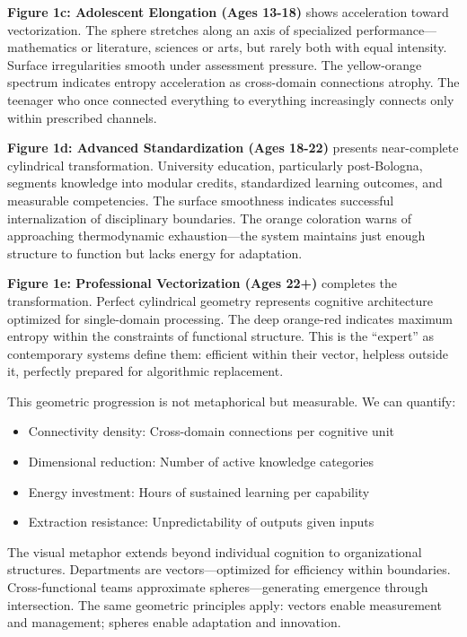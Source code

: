 \textbf{Figure 1c: Adolescent Elongation (Ages 13-18)} shows acceleration toward vectorization. The sphere stretches along an axis of specialized performance---mathematics or literature, sciences or arts, but rarely both with equal intensity. Surface irregularities smooth under assessment pressure. The yellow-orange spectrum indicates entropy acceleration as cross-domain connections atrophy. The teenager who once connected everything to everything increasingly connects only within prescribed channels.

\textbf{Figure 1d: Advanced Standardization (Ages 18-22)} presents near-complete cylindrical transformation. University education, particularly post-Bologna, segments knowledge into modular credits, standardized learning outcomes, and measurable competencies. The surface smoothness indicates successful internalization of disciplinary boundaries. The orange coloration warns of approaching thermodynamic exhaustion---the system maintains just enough structure to function but lacks energy for adaptation.

\textbf{Figure 1e: Professional Vectorization (Ages 22+)} completes the transformation. Perfect cylindrical geometry represents cognitive architecture optimized for single-domain processing. The deep orange-red indicates maximum entropy within the constraints of functional structure. This is the ``expert'' as contemporary systems define them: efficient within their vector, helpless outside it, perfectly prepared for algorithmic replacement.

This geometric progression is not metaphorical but measurable. We can quantify:
\begin{itemize}
\item Connectivity density: Cross-domain connections per cognitive unit
\item Dimensional reduction: Number of active knowledge categories
\item Energy investment: Hours of sustained learning per capability
\item Extraction resistance: Unpredictability of outputs given inputs
\end{itemize}

The visual metaphor extends beyond individual cognition to organizational structures. Departments are vectors---optimized for efficiency within boundaries. Cross-functional teams approximate spheres---generating emergence through intersection. The same geometric principles apply: vectors enable measurement and management; spheres enable adaptation and innovation.

